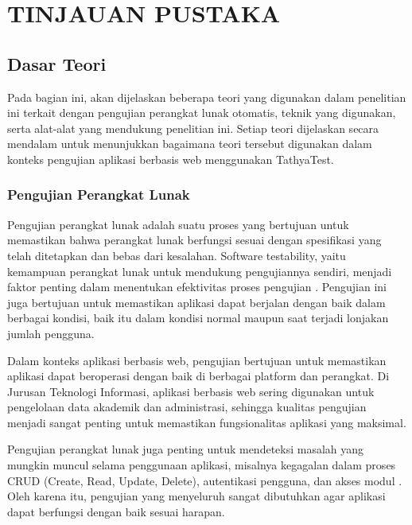 \chapter{TINJAUAN PUSTAKA}\label{bab-ii-tinjauan-pustaka}

\section{Dasar Teori}\label{dasar-teori}

Pada bagian ini, akan dijelaskan beberapa teori yang digunakan dalam penelitian ini terkait dengan pengujian perangkat lunak otomatis, teknik yang digunakan, serta alat-alat yang mendukung penelitian ini. Setiap teori dijelaskan secara mendalam untuk menunjukkan bagaimana teori tersebut digunakan dalam konteks pengujian aplikasi berbasis web menggunakan TathyaTest.

\subsection{Pengujian Perangkat Lunak}\label{pengujian-perangkat-lunak}

Pengujian perangkat lunak adalah suatu proses yang bertujuan untuk memastikan bahwa perangkat lunak berfungsi sesuai dengan spesifikasi yang telah ditetapkan dan bebas dari kesalahan. Software testability, yaitu kemampuan perangkat lunak untuk mendukung pengujiannya sendiri, menjadi faktor penting dalam menentukan efektivitas proses pengujian \parencite{garousi2019testability}. Pengujian ini juga bertujuan untuk memastikan aplikasi dapat berjalan dengan baik dalam berbagai kondisi, baik itu dalam kondisi normal maupun saat terjadi lonjakan jumlah pengguna.

Dalam konteks aplikasi berbasis web, pengujian bertujuan untuk memastikan aplikasi dapat beroperasi dengan baik di berbagai platform dan perangkat. Di Jurusan Teknologi Informasi, aplikasi berbasis web sering digunakan untuk pengelolaan data akademik dan administrasi, sehingga kualitas pengujian menjadi sangat penting untuk memastikan fungsionalitas aplikasi yang maksimal.

Pengujian perangkat lunak juga penting untuk mendeteksi masalah yang mungkin muncul selama penggunaan aplikasi, misalnya kegagalan dalam proses CRUD (Create, Read, Update, Delete), autentikasi pengguna, dan akses modul \parencite{wang2023}. Oleh karena itu, pengujian yang menyeluruh sangat dibutuhkan agar aplikasi dapat berfungsi dengan baik sesuai harapan.

